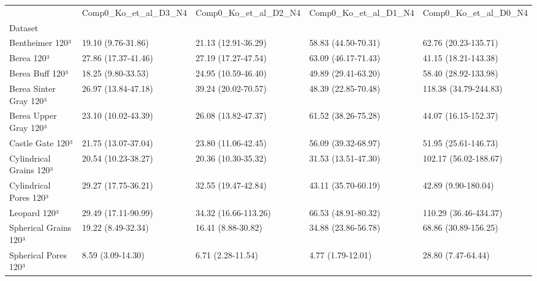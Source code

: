 \begin{tabular}{lllll}
\toprule
 & Comp0_Ko_et_al_D3_N4 & Comp0_Ko_et_al_D2_N4 & Comp0_Ko_et_al_D1_N4 & Comp0_Ko_et_al_D0_N4 \\
Dataset &  &  &  &  \\
\midrule
Bentheimer 120³ & 19.10 (9.76-31.86) & 21.13 (12.91-36.29) & 58.83 (44.50-70.31) & 62.76 (20.23-135.71) \\
Berea 120³ & 27.86 (17.37-41.46) & 27.19 (17.27-47.54) & 63.09 (46.17-71.43) & 41.15 (18.21-143.38) \\
Berea Buff 120³ & 18.25 (9.80-33.53) & 24.95 (10.59-46.40) & 49.89 (29.41-63.20) & 58.40 (28.92-133.98) \\
Berea Sinter Gray 120³ & 26.97 (13.84-47.18) & 39.24 (20.02-70.57) & 48.39 (22.85-70.48) & 118.38 (34.79-244.83) \\
Berea Upper Gray 120³ & 23.10 (10.02-43.39) & 26.08 (13.82-47.37) & 61.52 (38.26-75.28) & 44.07 (16.15-152.37) \\
Castle Gate 120³ & 21.75 (13.07-37.04) & 23.80 (11.06-42.45) & 56.09 (39.32-68.97) & 51.95 (25.61-146.73) \\
Cylindrical Grains 120³ & 20.54 (10.23-38.27) & 20.36 (10.30-35.32) & 31.53 (13.51-47.30) & 102.17 (56.02-188.67) \\
Cylindrical Pores 120³ & 29.27 (17.75-36.21) & 32.55 (19.47-42.84) & 43.11 (35.70-60.19) & 42.89 (9.90-180.04) \\
Leopard 120³ & 29.49 (17.11-90.99) & 34.32 (16.66-113.26) & 66.53 (48.91-80.32) & 110.29 (36.46-434.37) \\
Spherical Grains 120³ & 19.22 (8.49-32.34) & 16.41 (8.88-30.82) & 34.88 (23.86-56.78) & 68.86 (30.89-156.25) \\
Spherical Pores 120³ & 8.59 (3.09-14.30) & 6.71 (2.28-11.54) & 4.77 (1.79-12.01) & 28.80 (7.47-64.44) \\
\bottomrule
\end{tabular}
